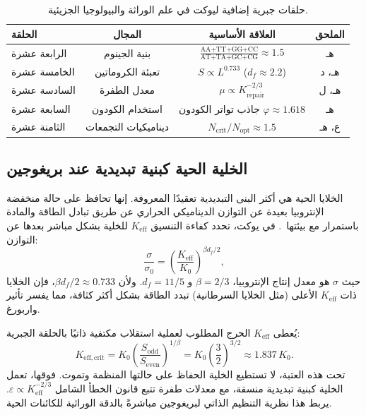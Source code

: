 \documentclass[11pt,a4paper]{article}
\newcommand{\Keff}{K_{\mathrm{eff}}}
\newcommand{\Sodd}{S_{\mathrm{odd}}}
\newcommand{\Seven}{S_{\mathrm{even}}}
\begin{document}
	\begin{table}[htbp]
		\centering
		\caption{حلقات جبرية إضافية ليوكت في علم الوراثة والبيولوجيا الجزيئية.}
		\label{tab:genetic-loops}
		\footnotesize
		\begin{tabular}{l c c c}
			\toprule
			\textbf{الحلقة} & \textbf{المجال} & \textbf{العلاقة الأساسية} & \textbf{الملحق} \\
			\midrule
			الرابعة عشرة & بنية الجينوم & \(\frac{\text{AA+TT+GG+CC}}{\text{AT+TA+GC+CG}} \approx 1.5\) & هـ \\
			الخامسة عشرة & تعبئة الكروماتين & \(S \propto L^{0.733}\) (\(d_f \approx 2.2\)) & هـ، د \\
			السادسة عشرة & معدل الطفرة & \(\mu \propto K_{\mathrm{repair}}^{-2/3}\) & هـ، ل \\
			السابعة عشرة & استخدام الكودون & جاذب تواتر الكودون \(\varphi \approx 1.618\) & هـ \\
			الثامنة عشرة & ديناميكيات التجمعات & \(N_{\mathrm{crit}}/N_{\mathrm{opt}} \approx 1.5\) & ع، هـ \\
			\bottomrule
		\end{tabular}
	\end{table}
	
	\subsection{الخلية الحية كبنية تبديدية عند بريغوجين}
	\label{subsec:prigogine}
	
	الخلايا الحية هي أكثر البنى التبديدية تعقيدًا المعروفة. إنها تحافظ على حالة منخفضة الإنتروبيا بعيدة عن التوازن الديناميكي الحراري عن طريق تبادل الطاقة والمادة باستمرار مع بيئتها~\cite{Prigogine1977}. في يوكت، تحدد كفاءة التنسيق \(\Keff\) للخلية بشكل مباشر بعدها عن التوازن:
	\begin{equation}
		\frac{\sigma}{\sigma_0} = \left( \frac{\Keff}{K_0} \right)^{\beta d_f / 2},
	\end{equation}
	حيث \(\sigma\) هو معدل إنتاج الإنتروبيا، \(\beta=2/3\) و \(d_f=11/5\). ولأن \(\beta d_f / 2 \approx 0.733\)، فإن الخلايا ذات \(\Keff\) الأعلى (مثل الخلايا السرطانية) تبدد الطاقة بشكل أكثر كثافة، مما يفسر تأثير واربورغ.
	
	يُعطى \(\Keff\) الحرج المطلوب لعملية استقلاب مكتفية ذاتيًا بالحلقة الجبرية:
	\begin{equation}
		K_{\mathrm{eff},\mathrm{crit}} = K_0 \left( \frac{\Sodd}{\Seven} \right)^{1/\beta}
		= K_0 \left( \frac{3}{2} \right)^{3/2} \approx 1.837\,K_0 .
	\end{equation}
	تحت هذه العتبة، لا تستطيع الخلية الحفاظ على حالتها المنظمة وتموت. فوقها، تعمل الخلية كبنية تبديدية منسقة، مع معدلات طفرة تتبع قانون الخطأ الشامل \(\varepsilon \propto \Keff^{-2/3}\). يربط هذا نظرية التنظيم الذاتي لبريغوجين مباشرةً بالدقة الوراثية للكائنات الحية.
	
\end{document}
